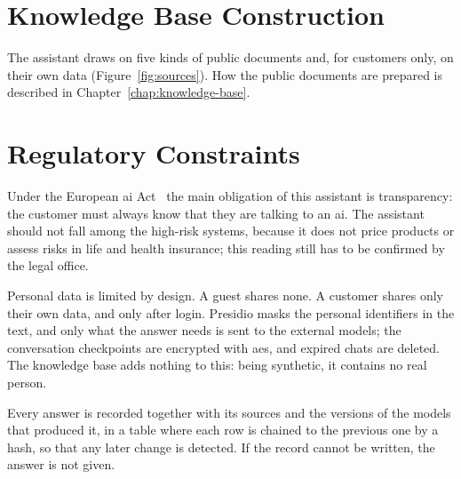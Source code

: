 \section{Knowledge Base Construction}
\label{sec:kb-summary}

The assistant draws on five kinds of public documents and, for customers only, on their own data
(Figure~\ref{fig:sources}). How the public documents are prepared is described in
Chapter~\ref{chap:knowledge-base}.



\section{Regulatory Constraints}
\label{sec:constraints}

Under the European \ac{ai} Act~\cite{euaiact2024} the main obligation of this assistant is
transparency: the customer must always know that they are talking to an \ac{ai}. The
assistant should not fall among the high-risk systems, because it does not price products or assess
risks in life and health insurance; this reading still has to be confirmed by the legal office.

Personal data is limited by design. A guest shares none. A customer shares only their own data, and
only after login. Presidio masks the personal identifiers in the text, and only what the answer
needs is sent to the external models; the conversation checkpoints are encrypted
with \ac{aes}, and expired chats are deleted. The knowledge base adds nothing to this: being
synthetic, it contains no real person.

Every answer is recorded together with its sources and the versions of the models that produced
it, in a table where each row is chained to the previous one by a hash, so that any later change
is detected. If the record cannot be written, the answer is not given.
